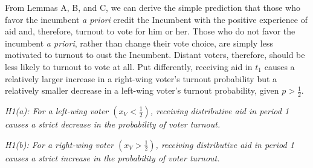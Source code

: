 \documentclass[12pt]{paper}
\begin{document}
From Lemmas A, B, and C, we can derive the simple prediction that those who favor the incumbent \emph{a priori} credit the Incumbent with the positive experience of aid and, therefore, turnout to vote for him or her. Those who do not favor the incumbent \emph{a priori}, rather than change their vote choice, are simply less motivated to turnout to oust the Incumbent. Distant voters, therefore, should be less likely to turnout to vote at all. Put differently, receiving aid in $t_1$ causes a relatively larger increase in a right-wing voter’s turnout probability but a relatively smaller decrease in a left-wing voter’s turnout probability, given $p > \frac{1}{2}$. 

\emph{H1(a): For a left-wing voter $(x_V < \frac{1}{2})$, receiving distributive aid in period 1 causes a strict decrease in the probability of voter turnout.}

\emph{H1(b): For a right-wing voter $(x_V > \frac{1}{2})$, receiving distributive aid in period 1 causes a strict increase in the probability of voter turnout.}



\end{document}
